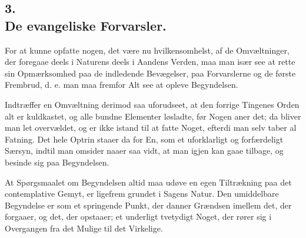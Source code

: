 \documentclass[12pt,a4paper]{book}
\begin{document}
\subsection*{3.\\[4pt] De evangeliske Forvarsler.}

For at kunne opfatte nogen, det være nu hvilkensomhelst, af de Omvæltninger, der
foregaae deels i Naturens deels i Aandens Verden, maa man især see at rette sin
Opmærksomhed paa de indledende Bevægelser, paa Forvarslerne og de første
Frembrud, d. e. man maa fremfor Alt see at opleve Begyndelsen.

Indtræffer en Omvæltning derimod saa uforudseet, at den forrige Tingenes Orden
alt er kuldkastet, og alle bundne Elementer løsladte, før Nogen aner det; da
bliver man let overvældet, og er ikke istand til at fatte Noget, efterdi man selv
taber al Fatning. Det hele Optrin staaer da for En, som et uforklarligt og
forfærdeligt Særsyn, indtil man omsider naaer saa vidt, at man igjen kan gaae
tilbage, og besinde sig paa Begyndelsen.

At Spørgsmaalet om Begyndelsen altid maa udøve en egen Tiltrækning paa det
contemplative Gemyt, er ligefrem grundet i Sagens Natur. Den umiddelbare
Begyndelse er som et springende Punkt, der danner Grændsen imellem det, der
forgaaer, og det, der opstaaer; et underligt tvetydigt Noget, der rører sig i
Overgangen fra det Mulige til det Virkelige.
\end{document}
